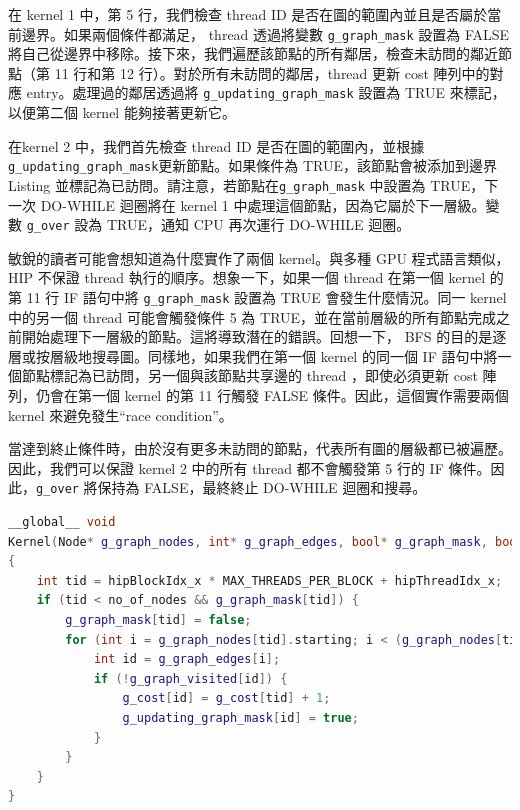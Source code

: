 {在 kernel 1 中，第 5 行，我們檢查 thread ID 是否在圖的範圍內並且是否屬於當前邊界。如果兩個條件都滿足， thread 透過將變數 \texttt{g\_graph\_mask} 設置為 FALSE 將自己從邊界中移除。接下來，我們遍歷該節點的所有鄰居，檢查未訪問的鄰近節點（第 11 行和第 12 行）。對於所有未訪問的鄰居，thread 更新 cost 陣列中的對應 entry。處理過的鄰居透過將 \texttt{g\_updating\_graph\_mask} 設置為 TRUE 來標記，以便第二個 kernel 能夠接著更新它。


在kernel 2 中，我們首先檢查 thread ID 是否在圖的範圍內，並根據 \texttt{g\_updating\_graph\_mask}更新節點。如果條件為 TRUE，該節點會被添加到邊界 Listing 並標記為已訪問。請注意，若節點在\texttt{g\_graph\_mask} 中設置為 TRUE，下一次 DO-WHILE 迴圈將在 kernel 1 中處理這個節點，因為它屬於下一層級。變數 \texttt{g\_over} 設為 TRUE，通知 CPU 再次運行 DO-WHILE 迴圈。


敏銳的讀者可能會想知道為什麼實作了兩個 kernel。與多種 GPU 程式語言類似，HIP 不保證 thread 執行的順序。想象一下，如果一個 thread 在第一個 kernel 的第 11 行 IF 語句中將 \texttt{g\_graph\_mask} 設置為 TRUE 會發生什麼情況。同一 kernel 中的另一個 thread 可能會觸發條件 5 為 TRUE，並在當前層級的所有節點完成之前開始處理下一層級的節點。這將導致潛在的錯誤。回想一下， BFS 的目的是逐層或按層級地搜尋圖。同樣地，如果我們在第一個 kernel 的同一個 IF 語句中將一個節點標記為已訪問，另一個與該節點共享邊的 thread ，即使必須更新 cost 陣列，仍會在第一個 kernel 的第 11 行觸發 FALSE 條件。因此，這個實作需要兩個 kernel 來避免發生“race condition”。


當達到終止條件時，由於沒有更多未訪問的節點，代表所有圖的層級都已被遍歷。因此，我們可以保證 kernel 2 中的所有 thread 都不會觸發第 5 行的 IF 條件。因此，\texttt{g\_over} 將保持為 FALSE，最終終止 DO-WHILE 迴圈和搜尋。

\lstset{style=mystyle}
\begin{lstlisting}[language=c++,caption={BFS的kernel1}]
__global__ void
Kernel(Node* g_graph_nodes, int* g_graph_edges, bool* g_graph_mask, bool* g_updating_graph_mask, bool *g_graph_visited, int* g_cost, int no_of_nodes)
{
    int tid = hipBlockIdx_x * MAX_THREADS_PER_BLOCK + hipThreadIdx_x;
    if (tid < no_of_nodes && g_graph_mask[tid]) {
        g_graph_mask[tid] = false;
        for (int i = g_graph_nodes[tid].starting; i < (g_graph_nodes[tid].no_of_edges + g_graph_nodes[tid].starting); i++) {
            int id = g_graph_edges[i];
            if (!g_graph_visited[id]) {
                g_cost[id] = g_cost[tid] + 1;
                g_updating_graph_mask[id] = true;
            }
        }
    }
}
\end{lstlisting}

}
